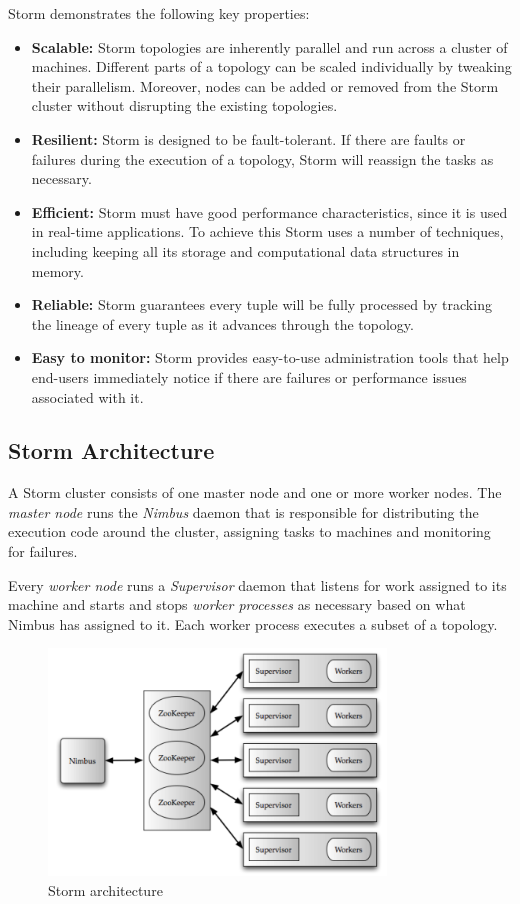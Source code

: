 Storm demonstrates the following key properties:
\begin{itemize}
\item \textbf{Scalable:} Storm topologies are inherently parallel and run across a cluster of machines. Different parts of a topology can be scaled individually by tweaking their parallelism. Moreover, nodes can be added or removed from the Storm cluster without disrupting the existing topologies.
\item \textbf{Resilient:} Storm is designed to be fault-tolerant. If there are faults or failures during the execution of a topology, Storm will reassign the tasks as necessary.
\item \textbf{Efficient:} Storm must have good performance characteristics, since it is used in real-time applications. To achieve this Storm uses a number of techniques, including keeping all its storage and computational data structures in memory.
\item \textbf{Reliable:} Storm guarantees every tuple will be fully processed by tracking the lineage of every tuple as it advances through the topology.
\item \textbf{Easy to monitor:} Storm provides easy-to-use administration tools that help end-users immediately notice if there are failures or performance issues associated with it.
\end{itemize}

\subsection{Storm Architecture}

A Storm cluster consists of one master node and one or more worker nodes. The \emph{master node} runs the \emph{Nimbus} daemon that is responsible for distributing the execution code around the cluster, assigning tasks to machines and monitoring for failures.

Every \emph{worker node} runs a \emph{Supervisor} daemon that listens for work assigned to its machine and starts and stops \emph{worker processes} as necessary based on what Nimbus has assigned to it. Each worker process executes a subset of a topology.

\begin{figure}[h!]
\centering
\includegraphics[width=0.8\textwidth]{figures/storm_cluster}
\caption{Storm architecture}
\label{figure:storm_cluster}
\end{figure}


